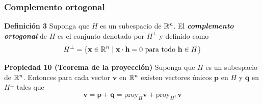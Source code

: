 \begin{frame}\frametitle{Complemento ortogonal}
	
	\begin{defi}{\textbf{Definición 3}}
		\justifying
		Suponga que $H$ es un subespacio de $\mathbb{R}^n$. El \textbf{\textit{complemento ortogonal}} de $H$ es el conjunto denotado
		por $H^{\perp}$ y definido como
		\[
		H^{\perp} = \{ \mathbf{x}\in\mathbb{R}^n \mid  \mathbf{x}\cdot \mathbf{h}=0 \text{ para todo } \mathbf{h}\in H \}
		\]
		
		\vspace{-1mm}
	\end{defi}	
	
%		
%		
	
	\begin{prop}{\textbf{Propiedad 10 (Teorema de la proyección)}}
		\justifying Suponga que $H$ es un subespacio de $\mathbb{R}^n$. Entonces para cada vector $\mathbf{v}$ en $\mathbb{R}^n$
		existen vectores únicos $\mathbf{p}$ en $H$ y $\mathbf{q}$ en $H^{\perp}$ tales que 
		\[
			\mathbf{v} = \mathbf{p} + \mathbf{q} = \text{proy}_H \mathbf{v} + \text{proy}_{H^{\perp}} \mathbf{v}
		\]
		
	\end{prop}	
	
\end{frame}


\subsection{}


